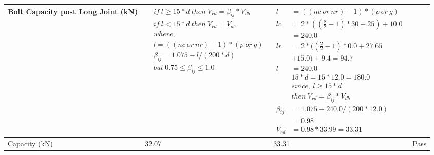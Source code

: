 \documentclass{article}%
\begin{document}
\begin{longtable}{|p{4cm}|p{5cm}|p{5.5cm}|p{1.5cm}|}
Bolt Capacity post Long Joint (kN)&$\begin{aligned} &if~l\geq 15 * d~then~V_{rd} = \beta_{ij} * V_{db} \\ & if~l < 15 * d~then~V_{rd} = V_{db} \\ & where,\\ & l = ((nc~or~nr) - 1) * (p~or~g) \\ & \beta_{ij} = 1.075 - l/(200 * d) \\ & but~0.75\leq\beta_{ij}\leq1.0 \end{aligned}$&$\begin{aligned} l~&= ((nc~or~nr) - 1) * (p~or~g) \\  lc&= 2*((\frac{8}{2} - 1) * 30+25)+ 10.0\\&=240.0\\  lr&= 2*((\frac{2}{2} - 1) * 0.0+27.65\\& +15.0)+ 9.4=94.7\\  l~&= 240.0\\ &15 * d = 15 * 12.0 = 180.0 \\ &since,~l \geq 15 * d~\\ &then~V_{rd} = \beta_{ij} * V_{db} \\ \beta_{ij} &= 1.075 - 240.0/(200*12.0)\\& =0.98\\  V_{rd}& = 0.98 * 33.99=33.31 \end{aligned}$&\\%
\hline%
Capacity (kN)&32.07&33.31&Pass\\%
\hline%
\end{longtable}

%
\newpage%
\end{document}
